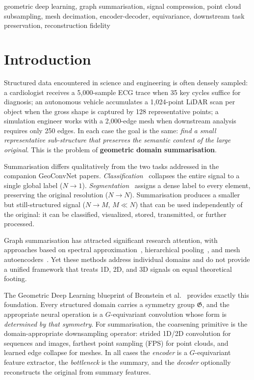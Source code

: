 \documentclass[10pt,conference]{IEEEtran}
\newcommand{\fG}{\mathfrak{G}}
\begin{document}
\begin{IEEEkeywords}
geometric deep learning, graph summarisation, signal compression, point
cloud subsampling, mesh decimation, encoder-decoder, equivariance,
downstream task preservation, reconstruction fidelity
\end{IEEEkeywords}

\section{Introduction}
\label{sec:intro}

Structured data encountered in science and engineering is often densely
sampled: a cardiologist receives a 5{,}000-sample ECG trace when 35 key
cycles suffice for diagnosis; an autonomous vehicle accumulates a
1{,}024-point LiDAR scan per object when the gross shape is captured by
128 representative points; a simulation engineer works with a 2{,}000-edge
mesh when downstream analysis requires only 250 edges.  In each case the
goal is the same: \emph{find a small representative sub-structure that
preserves the semantic content of the large original}.  This is the
problem of \textbf{geometric domain summarisation}.

Summarisation differs qualitatively from the two tasks addressed in the
companion GeoConvNet papers.  \emph{Classification}~\cite{geoconvnet_cls}
collapses the entire signal to a single global label ($N \to 1$).
\emph{Segmentation}~\cite{geoconvnet_seg} assigns a dense label to every
element, preserving the original resolution ($N \to N$).  Summarisation
produces a smaller but still-structured signal ($N \to M$, $M \ll N$)
that can be used independently of the original: it can be classified,
visualized, stored, transmitted, or further processed.

Graph summarisation has attracted significant research attention, with
approaches based on spectral approximation~\cite{loukas2019graph},
hierarchical
pooling~\cite{ying2018hierarchical,gao2019graph,defferrard2016convolutional},
and mesh autoencoders~\cite{ranjan2018generating}.  Yet these methods
address individual domains and do not provide a unified framework that
treats 1D, 2D, and 3D signals on equal theoretical footing.

The Geometric Deep Learning blueprint of Bronstein et
al.~\cite{bronstein2021geometric} provides exactly this foundation.
Every structured domain carries a symmetry group $\fG$, and the
appropriate neural operation is a $G$-equivariant convolution whose form
is \emph{determined by that symmetry}.  For summarisation, the coarsening
primitive is the domain-appropriate downsampling operator: strided 1D/2D
convolution for sequences and images, farthest point sampling (FPS) for
point clouds, and learned edge collapse for meshes.  In all cases the
\emph{encoder} is a $G$-equivariant feature extractor, the
\emph{bottleneck} is the summary, and the \emph{decoder} optionally
reconstructs the original from summary features.
\end{document}

